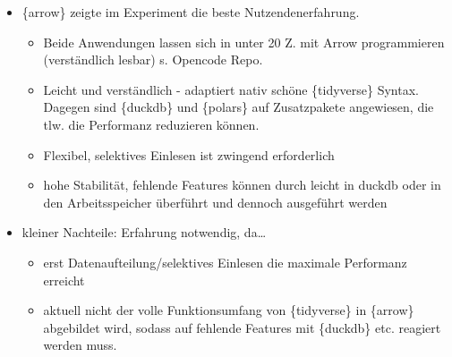 \documentclass[
  german,
  10pt,
  twoside]{article}
\providecommand{\tightlist}{%
  \setlength{\itemsep}{0pt}\setlength{\parskip}{0pt}}
\begin{document}
\begin{itemize}
\tightlist
\item
  \{arrow\} zeigte im Experiment die beste Nutzendenerfahrung.

  \begin{itemize}
  \tightlist
  \item
    Beide Anwendungen lassen sich in unter 20 Z. mit Arrow programmieren
    (verständlich lesbar) s. Opencode Repo.
  \item
    Leicht und verständlich - adaptiert nativ schöne \{tidyverse\}
    Syntax. Dagegen sind \{duckdb\} und \{polars\} auf Zusatzpakete
    angewiesen, die tlw. die Performanz reduzieren können.
  \item
    Flexibel, selektives Einlesen ist zwingend erforderlich
  \item
    hohe Stabilität, fehlende Features können durch leicht in duckdb
    oder in den Arbeitsspeicher überführt und dennoch ausgeführt werden
  \end{itemize}
\item
  kleiner Nachteile: Erfahrung notwendig, da\ldots{}

  \begin{itemize}
  \tightlist
  \item
    erst Datenaufteilung/selektives Einlesen die maximale Performanz
    erreicht
  \item
    aktuell nicht der volle Funktionsumfang von \{tidyverse\} in
    \{arrow\} abgebildet wird, sodass auf fehlende Features mit
    \{duckdb\} etc. reagiert werden muss.
  \end{itemize}
\end{itemize}
\end{document}
